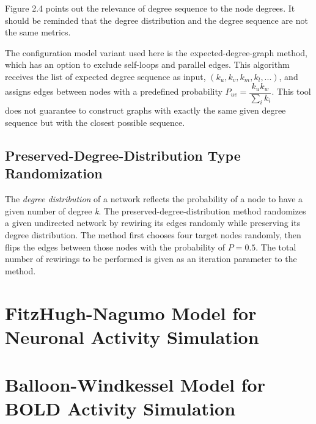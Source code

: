 Figure 2.4 points out the relevance of degree sequence to the node degrees. It should be reminded that the degree distribution and the degree sequence are not the same metrics.  

The configuration model variant used here is the expected-degree-graph method, which has an option to exclude self-loops and parallel edges. This algorithm receives the list of expected degree sequence as input, $(k_u, k_v, k_m, k_l, ...)$, and assigns edges between nodes with a predefined probability $P_{uv}=\dfrac{k_u k_w}{\sum_{i}k_i}$. This tool does not guarantee to construct graphs with exactly the same given degree sequence but with the closest possible sequence.  

\subsection{Preserved-Degree-Distribution Type Randomization}

The \textit{degree distribution} of a network reflects the probability of a node to have a given number of degree \textit{k}. The preserved-degree-distribution method randomizes a given undirected network by rewiring its edges randomly while preserving its degree distribution. The method first chooses four target nodes randomly, then flips the edges between those nodes with the probability of $P=0.5$. The total number of rewirings to be performed is given as an iteration parameter to the method. 

 

 

\section{FitzHugh-Nagumo Model for Neuronal Activity Simulation}

\section{Balloon-Windkessel Model for BOLD Activity Simulation} 
 
